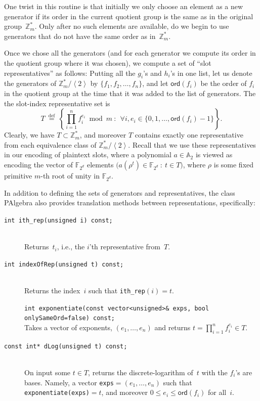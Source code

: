 \documentclass[14pt]{extarticle}
\newcommand{\A}{\mathbb{A}}
\newcommand{\F}{\mathbb{F}}
\newcommand{\Z}{\mathbb{Z}}
\newcommand{\grp}[1]{\left\langle #1 \right\rangle}
\def\ord{\mathsf{ord}}
\def\eqdef{\stackrel{\mathrm{def}}{=}}
\def\PAlgebra{\textsf{PAlgebra}}
\begin{document}
One twist in this routine is that initially we only choose an element
as a new generator if its order in the current quotient group is the
same as in the original group~$\Z_m^*$. Only after no such elements
are available, do we begin to use generators that do not have the
same order as in~$\Z_m^*$.

Once we chose all the generators (and for each generator we compute
its order in the quotient group where it was chosen), we compute a
set of ``slot representatives'' as follows: Putting all the $g_i$'s
and $h_i$'s in one list, let us denote the generators of $\Z_m^*/
\grp{2}$ by $\{f_1,f_2,\ldots,f_n\}$, and let $\ord(f_i)$ be the
order of $f_i$ in the quotient group at the time that it was added
to the list of generators. The the slot-index representative set is
\[
T ~\eqdef~ \left\{ \prod_{i=1}^n f_i^{e_i} \bmod m ~:~
   ~\forall i, e_i \in \{0,1,\ldots,\ord(f_i)-1\} \right\}.
\]
Clearly, we have $T\subset\Z_m^*$, and moreover $T$ contains exactly
one representative from each equivalence class of $\Z_m^*/\grp{2}$.
Recall that we use these representatives in our encoding of plaintext
slots, where a polynomial $a\in\A_2$ is viewed as encoding the vector
of $\F_{2^d}$ elements $\big(a(\rho^t)\in\F_{2^d}~:~t\in T\big)$,
where $\rho$ is some fixed primitive $m$-th root of unity in
$\F_{2^d}$.

In addition to defining the sets of generators and representatives,
the class {\PAlgebra} also provides translation methods between
representations, specifically:
\begin{description}
\item[\texttt{int ith\_rep(unsigned i) const;}]\ \\
  Returns~$t_i$, i.e., the $i$'th representative from~$T$.
\item[\texttt{int indexOfRep(unsigned t) const;}]\ \\
  Returns the index~$i$ such that \texttt{ith\_rep}$(i)=t$.

\item[]\hspace{-0.5em}\texttt{int exponentiate(const vector<unsigned>\& exps, \newline 
              bool onlySameOrd=false) const;}\ \\
  Takes a vector of exponents, $(e_1,\ldots,e_n)$ and returns
  $t = \prod_{i=1}^n f_i^{e_i} \in T$.

\item[\texttt{const int* dLog(unsigned t) const;}]\ \\
  On input some $t\in T$, returns the discrete-logarithm of~$t$ with
  the $f_i$'s are bases. Namely, a vector \texttt{exps}$=(e_1,\ldots,
  e_n)$ such that \texttt{exponentiate(exps)}$=t$, and moreover
  $0\le e_i\le\ord(f_i)$ for all~$i$.
\end{description}
\end{document}

